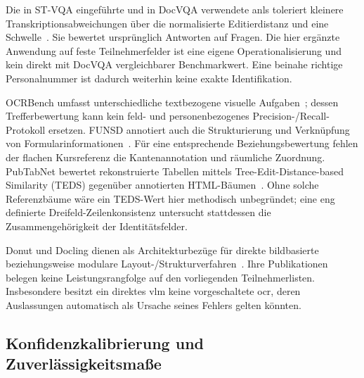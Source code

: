 Die in ST-VQA eingeführte und in DocVQA verwendete \ac{anls} toleriert kleinere Transkriptionsabweichungen über die normalisierte Editierdistanz und eine Schwelle~\cite{Biten2019STVQA,Mathew2021DocVQA}. Sie bewertet ursprünglich Antworten auf Fragen. Die hier ergänzte Anwendung auf feste Teilnehmerfelder ist eine eigene Operationalisierung und kein direkt mit DocVQA vergleichbarer Benchmarkwert. Eine beinahe richtige Personalnummer ist dadurch weiterhin keine exakte Identifikation.

OCRBench umfasst unterschiedliche textbezogene visuelle Aufgaben~\cite{Liu2024OCRBench}; dessen Trefferbewertung kann kein feld- und personenbezogenes Precision-/Recall-Protokoll ersetzen. FUNSD annotiert auch die Strukturierung und Verknüpfung von Formularinformationen~\cite{Jaume2019FUNSD}. Für eine entsprechende Beziehungsbewertung fehlen der flachen Kursreferenz die Kantenannotation und räumliche Zuordnung. PubTabNet bewertet rekonstruierte Tabellen mittels Tree-Edit-Distance-based Similarity (TEDS) gegenüber annotierten HTML-Bäumen~\cite{Zhong2020PubTabNet}. Ohne solche Referenzbäume wäre ein TEDS-Wert hier methodisch unbegründet; eine eng definierte Dreifeld-Zeilenkonsistenz untersucht stattdessen die Zusammengehörigkeit der Identitätsfelder.

Donut und Docling dienen als Architekturbezüge für direkte bildbasierte beziehungsweise modulare Layout-/Strukturverfahren~\cite{Kim2022Donut,Auer2024DoclingSelection}. Ihre Publikationen belegen keine Leistungsrangfolge auf den vorliegenden Teilnehmerlisten. Insbesondere besitzt ein direktes \ac{vlm} keine vorgeschaltete \ac{ocr}, deren Auslassungen automatisch als Ursache seines Fehlers gelten könnten.

\subsection{Konfidenzkalibrierung und Zuverlässigkeitsmaße}
\label{subsec:kalibrierung-grundlagen}

